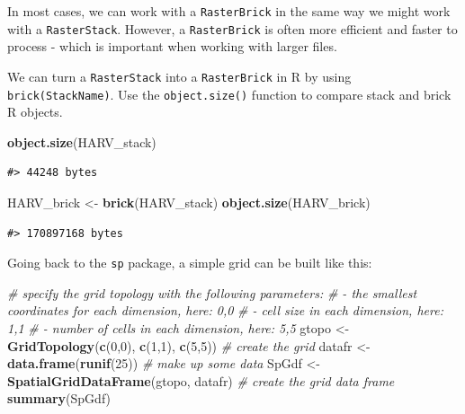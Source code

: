 \documentclass[]{book}
\newenvironment{Shaded}{\begin{snugshade}}{\end{snugshade}}
\newcommand{\KeywordTok}[1]{\textcolor[rgb]{0.13,0.29,0.53}{\textbf{#1}}}
\newcommand{\DecValTok}[1]{\textcolor[rgb]{0.00,0.00,0.81}{#1}}
\newcommand{\StringTok}[1]{\textcolor[rgb]{0.31,0.60,0.02}{#1}}
\newcommand{\CommentTok}[1]{\textcolor[rgb]{0.56,0.35,0.01}{\textit{#1}}}
\newcommand{\NormalTok}[1]{#1}
\begin{document}
In most cases, we can work with a \texttt{RasterBrick} in the same way
we might work with a \texttt{RasterStack}. However, a
\texttt{RasterBrick} is often more efficient and faster to process -
which is important when working with larger files.

We can turn a \texttt{RasterStack} into a \texttt{RasterBrick} in R by
using \texttt{brick(StackName)}. Use the \texttt{object.size()} function
to compare stack and brick R objects.

\begin{Shaded}
\begin{Highlighting}[]
\KeywordTok{object.size}\NormalTok{(HARV_stack)}
\end{Highlighting}
\end{Shaded}

\begin{verbatim}
#> 44248 bytes
\end{verbatim}

\begin{Shaded}
\begin{Highlighting}[]
\NormalTok{HARV_brick <-}\StringTok{ }\KeywordTok{brick}\NormalTok{(HARV_stack)}
\KeywordTok{object.size}\NormalTok{(HARV_brick)}
\end{Highlighting}
\end{Shaded}

\begin{verbatim}
#> 170897168 bytes
\end{verbatim}

Going back to the \texttt{sp} package, a simple grid can be built like
this:

\begin{Shaded}
\begin{Highlighting}[]
\CommentTok{# specify the grid topology with the following parameters:}
\CommentTok{# - the smallest coordinates for each dimension, here: 0,0}
\CommentTok{# - cell size in each dimension, here: 1,1 }
\CommentTok{# - number of cells in each dimension, here: 5,5}
\NormalTok{gtopo <-}\StringTok{ }\KeywordTok{GridTopology}\NormalTok{(}\KeywordTok{c}\NormalTok{(}\DecValTok{0}\NormalTok{,}\DecValTok{0}\NormalTok{), }\KeywordTok{c}\NormalTok{(}\DecValTok{1}\NormalTok{,}\DecValTok{1}\NormalTok{), }\KeywordTok{c}\NormalTok{(}\DecValTok{5}\NormalTok{,}\DecValTok{5}\NormalTok{)) }\CommentTok{# create the grid}
\NormalTok{datafr <-}\StringTok{ }\KeywordTok{data.frame}\NormalTok{(}\KeywordTok{runif}\NormalTok{(}\DecValTok{25}\NormalTok{)) }\CommentTok{# make up some data}
\NormalTok{SpGdf <-}\StringTok{ }\KeywordTok{SpatialGridDataFrame}\NormalTok{(gtopo, datafr) }\CommentTok{# create the grid data frame}
\KeywordTok{summary}\NormalTok{(SpGdf)}
\end{Highlighting}
\end{Shaded}
\end{document}

